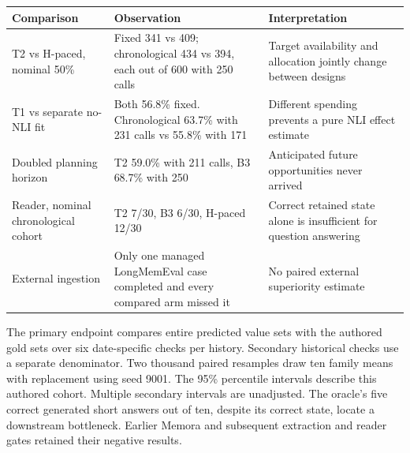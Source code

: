 \documentclass[
  11pt,
]{article}
\newcounter{none} %
\begin{document}
{\def\LTcaptype{none} %
\begin{longtable}[]{@{}
  >{\raggedright\arraybackslash}p{}
  >{\raggedright\arraybackslash}p{}
  >{\raggedright\arraybackslash}p{}@{}}
\toprule\noalign{}
\begin{minipage}[b]{\linewidth}\raggedright
Comparison
\end{minipage} & \begin{minipage}[b]{\linewidth}\raggedright
Observation
\end{minipage} & \begin{minipage}[b]{\linewidth}\raggedright
Interpretation
\end{minipage} \\
\midrule\noalign{}
\endhead
\bottomrule\noalign{}
\endlastfoot
T2 vs H-paced, nominal 50\% & Fixed 341 vs 409; chronological 434 vs
394, each out of 600 with 250 calls & Target availability and allocation
jointly change between designs \\
T1 vs separate no-NLI fit & Both 56.8\% fixed. Chronological 63.7\% with
231 calls vs 55.8\% with 171 & Different spending prevents a pure NLI
effect estimate \\
Doubled planning horizon & T2 59.0\% with 211 calls, B3 68.7\% with 250
& Anticipated future opportunities never arrived \\
Reader, nominal chronological cohort & T2 7/30, B3 6/30, H-paced 12/30 &
Correct retained state alone is insufficient for question answering \\
External ingestion & Only one managed LongMemEval case completed and
every compared arm missed it & No paired external superiority
estimate \\
\end{longtable}
}

The primary endpoint compares entire predicted value sets with the
authored gold sets over six date-specific checks per history. Secondary
historical checks use a separate denominator. Two thousand paired
resamples draw ten family means with replacement using seed 9001. The
95\% percentile intervals describe this authored cohort. Multiple
secondary intervals are unadjusted. The oracle's five correct generated
short answers out of ten, despite its correct state, locate a downstream
bottleneck. Earlier Memora and subsequent extraction and reader gates
retained their negative results.
\end{document}
